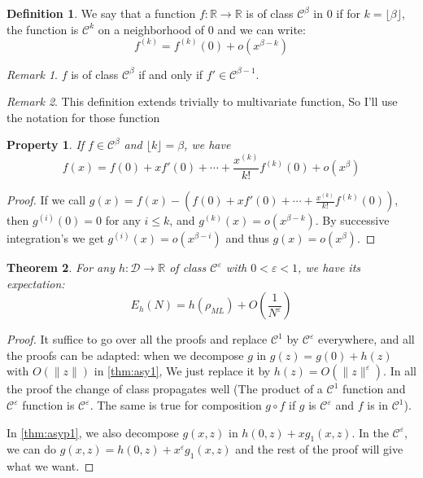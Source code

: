 \documentclass[10pt,a4paper]{report}
\theoremstyle{plain}
\newtheorem{thm}{Theorem}[chapter]
\newtheorem{prop}[thm]{Property}
\theoremstyle{definition}
\newtheorem{defn}{Definition}[chapter]
\theoremstyle{remark}
\newtheorem*{rem}{Remark}
\newcommand{\R}{\ensuremath{\mathbb{R}}}
\renewcommand{\leq}{\leqslant}
\newcommand{\class}[1]{{\mathscr{C}^{#1}}}
\newcommand{\ml}{_{M\!L}}
\begin{document}
\begin{defn}
  We say that a function $f : \R \to \R$ is of class $\class \beta$ in $0$ if
  for $k = \lfloor \beta \rfloor$, the function is $\class k$ on a neighborhood
  of $0$ and we can write:
  \[f^{(k)} = f^{(k)}(0) + o(x^{\beta-k})\]
\end{defn}

\begin{rem}
  $f$ is of class $\class \beta$ if and only if $f' \in \class{\beta-1}$.
\end{rem}

\begin{rem}
This definition extends trivially to multivariate function, So I'll use the
notation for those function
\end{rem}

\begin{prop}
  If $f \in \class \beta$ and $\lfloor k \rfloor = \beta$, we have
  \[f(x) = f(0) + xf'(0) + \cdots + \frac{x^{(k)}}{k!}f^{(k)}(0) + o(x^\beta)\]
\end{prop}

\begin{proof}
  If we call $g(x) = f(x) - \left(f(0) + xf'(0) + \cdots +
    \frac{x^{(k)}}{k!}f^{(k)}(0)\right)$, then $g^{(i)}(0) = 0$ for any $i \leq
  k$, and $g^{(k)}(x) = o(x^{\beta - k})$. By successive integration's we get
  $g^{(i)}(x) = o(x^{\beta-i})$ and thus $g(x) = o(x^\beta)$.
\end{proof}

\begin{thm}
  For any $h : \mathcal{D} \to \R$ of class $\class \varepsilon$ with $0 <
  \varepsilon < 1$, we have its expectation:
  \[E_h(N) = h (\rho\ml) + O\left(\frac 1 {N^\varepsilon}\right)\]
\end{thm}

\begin{proof}
  It suffice to go over all the proofs and replace $\class 1$ by $\class
  \varepsilon$ everywhere, and all the proofs can be adapted: when we
  decompose $g$ in $g(z) = g(0) + h(z)$ with $O(\|z\|)$ in \cref{thm:asy1}, We
  just replace it by $h(z) = O(\|z\|^\varepsilon)$. In all the proof the change
  of class propagates well (The product of a $\class 1$ function and $\class \varepsilon$
  function is $\class \varepsilon$. The same is true for composition $g \circ f$
  if $g$ is $\class \varepsilon$ and $f$ is in $\class 1$).

  In \cref{thm:asyp1}, we also decompose $g(x,z)$ in $h(0,z) + xg_1(x,z)$. In
  the $\class \varepsilon$, we can do $g(x,z) = h(0,z) + x^\varepsilon g_1(x,z)$
  and the rest of the proof will give what we want.
\end{proof}
\end{document}
